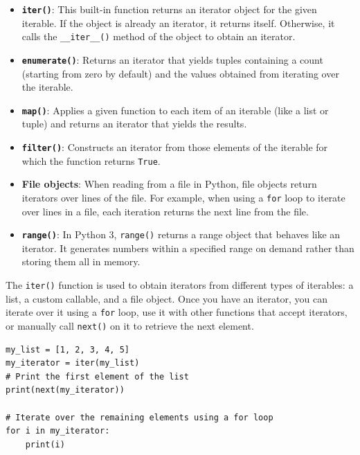\begin{itemize}
    \item \textbf{\texttt{iter()}}: This built-in function returns an iterator object for the given iterable. If the object is already an iterator, it returns itself. Otherwise, it calls the \texttt{\_\_iter\_\_()} method of the object to obtain an iterator.
    
    \item \textbf{\texttt{enumerate()}}: Returns an iterator that yields tuples containing a count (starting from zero by default) and the values obtained from iterating over the iterable.
    
    \item \textbf{\texttt{map()}}: Applies a given function to each item of an iterable (like a list or tuple) and returns an iterator that yields the results.
    
    \item \textbf{\texttt{filter()}}: Constructs an iterator from those elements of the iterable for which the function returns \texttt{True}.
    
    \item \textbf{File objects}: When reading from a file in Python, file objects return iterators over lines of the file. For example, when using a \texttt{for} loop to iterate over lines in a file, each iteration returns the next line from the file.
    
    \item \textbf{\texttt{range()}}: In Python 3, \texttt{range()} returns a range object that behaves like an iterator. It generates numbers within a specified range on demand rather than storing them all in memory.
\end{itemize}

The \texttt{iter()} function is used to obtain iterators from different types of iterables: a list, a custom callable, and a file object. Once you have an iterator, you can iterate over it using a \texttt{for} loop, use it with other functions that accept iterators, or manually call \texttt{next()} on it to retrieve the next element.

\begin{codebox}
\begin{verbatim}
my_list = [1, 2, 3, 4, 5]
my_iterator = iter(my_list)
# Print the first element of the list
print(next(my_iterator))

# Iterate over the remaining elements using a for loop
for i in my_iterator:
    print(i)
\end{verbatim}
\end{codebox}

